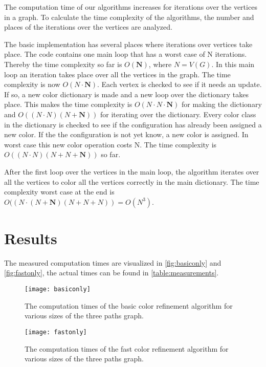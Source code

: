 \documentclass[twoside]{article}
\begin{document}
\begin{multicols}{2}
The computation time of our algorithms increases for iterations over the vertices in a graph. To calculate the time complexity of the algorithms, the number and places of the iterations over the vertices are analyzed. 

The basic implementation has several places where iterations over vertices take place. The code contains one main loop that has a worst case of N iterations. Thereby the time complexity so far is $O(\boldsymbol{N})$, where $N = V(G)$. In this main loop an iteration takes place over all the vertices in the graph. The time complexity is now $O(N \cdot \boldsymbol{N})$. Each vertex is checked to see if it needs an update. If so, a new color dictionary is made and a new loop over the dictionary takes place. This makes the time complexity is $O(N \cdot N \cdot \boldsymbol{N})$ for making the dictionary and $O((N \cdot N)(N+\boldsymbol{N}))$ for iterating over the dictionary. Every color class in the dictionary is checked to see if the configuration has already been assigned a new color. If the the configuration is not yet know, a new color is assigned. In worst case this new color operation costs N. The time complexity is $O((N \cdot N)(N+N+\boldsymbol{N}))$ so far.

After the first loop over the vertices in the main loop, the algorithm iterates over all the vertices to color all the vertices correctly in the main dictionary. The time complexity worst case at the end is $O((N \cdot (N+\boldsymbol{N})(N+N+N)) = O(N^3)$.

\section{Results}
\label{results}
The measured computation times are visualized in \autoref{fig:basiconly} and \autoref{fig:fastonly}, the actual times can be found in \autoref{table:measurements}.

\begin{figure}[H]
	\texttt{[image: basiconly]}
	\caption{The computation times of the basic color refinement algorithm for various sizes of the three paths graph.}
	\label{fig:basiconly}
\end{figure}

\begin{figure}[H]
	\texttt{[image: fastonly]}
	\caption{The computation times of the fast color refinement algorithm for various sizes of the three paths graph.}
	\label{fig:fastonly}
\end{figure}


\end{multicols}
\end{document}
